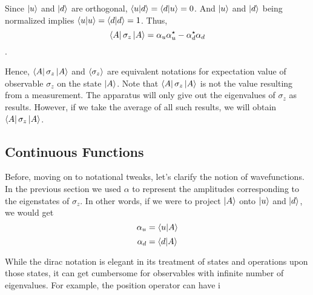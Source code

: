 \documentclass{article}
\begin{document}
  Since \(\ket{u}\) and \(\ket{d}\) are orthogonal, \(\bra{u}\ket{d} =
  \bra{d}\ket{u} = 0\). And \(\ket{u}\) and \(\ket{d}\) being normalized implies
  \(\bra{u}\ket{u} = \bra{d}\ket{d} = 1\). Thus,
  \[\bra{A}\sigma_z\ket{A} = \alpha_u\alpha_{u}^{\star} - \alpha_{d}^{\star}\alpha_{d}\].

  Hence, \(\bra{A}\sigma_z\ket{A}\) and \(\expval{\sigma_z}\) are equivalent
  notations for expectation value of observable \(\sigma_z\) on the state
  \(\ket{A}\). Note that \(\bra{A}\sigma_z\ket{A}\) is not the value resulting
  from a measurement. The apparatus will only give out the eigenvalues of
  \(\sigma_z\) as results. However, if we take the average of all such results,
  we will obtain \(\bra{A}\sigma_z\ket{A}\).

  \subsection{Continuous Functions}
    Before, moving on to notational tweaks, let's clarify the notion of
    wavefunctions. In the previous section we used \(\alpha\) to represent
    the amplitudes corresponding to the eigenstates of \(\sigma_z\).
    In other words, if we were to project \(\ket{A}\) onto \(\ket{u}\) and
    \(\ket{d}\), we would get
    \[\alpha_u = \bra{u}\ket{A}\]
    \[\alpha_d = \bra{d}\ket{A}\]


    While the dirac notation is elegant in its treatment of states and operations
    upon those states, it can get cumbersome for observables with infinite number
    of eigenvalues. For example, the position operator can have i
\end{document}
